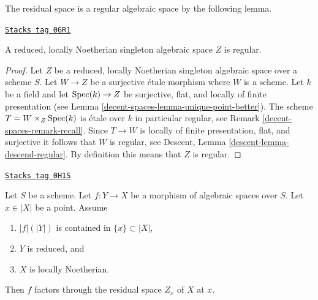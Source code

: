 The residual space is a regular algebraic space by the following lemma.

\begin{lemma}
\label{decent-spaces-lemma-residual-space-regular}
\href{https://stacks.math.columbia.edu/tag/06R1}{\texttt{Stacks tag 06R1}}

A reduced, locally Noetherian singleton algebraic space $Z$ is regular.
\end{lemma}

\begin{proof}
Let $Z$ be a reduced, locally Noetherian singleton algebraic space
over a scheme $S$. Let $W \to Z$ be a surjective \'etale morphism where $W$
is a scheme. Let $k$ be a field and let $\operatorname{Spec}(k) \to Z$
be surjective, flat, and locally of finite presentation (see
Lemma \ref{decent-spaces-lemma-unique-point-better}).
The scheme $T = W \times_Z \operatorname{Spec}(k)$ is
\'etale over $k$ in particular regular, see
Remark \ref{decent-spaces-remark-recall}.
Since $T \to W$ is locally of finite presentation, flat, and surjective it
follows that $W$ is regular, see
Descent, Lemma \ref{descent-lemma-descend-regular}.
By definition this means that $Z$ is regular.
\end{proof}

\begin{lemma}
\label{decent-spaces-lemma-factor-through-residual-space-Noetherian}
\href{https://stacks.math.columbia.edu/tag/0H1S}{\texttt{Stacks tag 0H1S}}

Let $S$ be a scheme. Let $f : Y \to X$ be a morphism of algebraic
spaces over $S$. Let $x \in |X|$ be a point. Assume
\begin{enumerate}
\item $|f|(|Y|)$ is contained in $\{x\} \subset |X|$,
\item $Y$ is reduced, and
\item $X$ is locally Noetherian.
\end{enumerate}
Then $f$ factors through the residual space $Z_x$ of $X$ at $x$.
\end{lemma}

